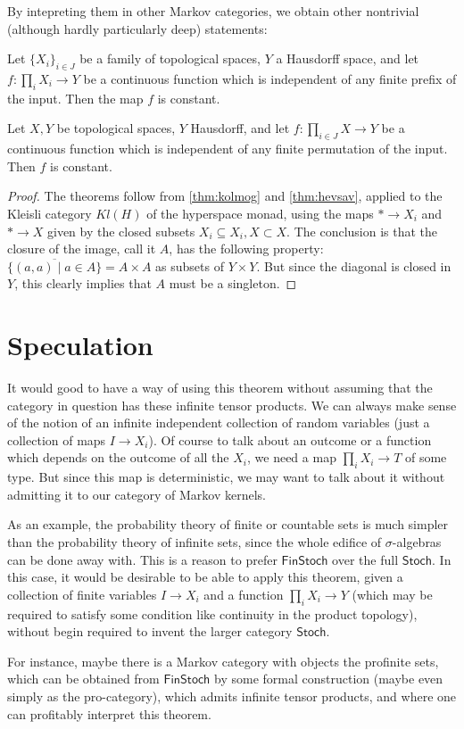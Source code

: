 \documentclass[11pt]{article}
\renewcommand{\sf}{\mathsf}
\begin{document}
By intepreting them in other Markov categories, we obtain other nontrivial (although hardly particularly deep) statements:

\begin{corollary}
    Let $\{X_i\}_{i \in J}$ be a family of topological spaces, $Y$ a Hausdorff space, and let $f: \prod_i X_i \to Y$ be a continuous function
    which is independent of any finite prefix of the input.
    Then the map $f$ is constant.
\end{corollary}
\begin{corollary}
    Let $X, Y$ be topological spaces, $Y$ Hausdorff, and let $f: \prod_{i\in J} X \to Y$ be a continuous function which is independent of any finite permutation of the input.
    Then $f$ is constant.
\end{corollary}
\begin{proof}
    The theorems follow from \cref{thm:kolmog} and \cref{thm:hevsav}, applied to the Kleisli category $Kl(H)$ of the hyperspace monad,
    using the maps $* \to X_i$ and $* \to X$ given by the closed subsets $X_i \subseteq X_i, X \subset X$.
    The conclusion is that the closure of the image, call it $A$, has the following property: $\overline{\{(a,a) \mid a \in A\}} = A \times A$ as subsets of $Y \times Y$.
    But since the diagonal is closed in $Y$, this clearly implies that $A$ must be a singleton.
\end{proof}


\section{Speculation}
It would good to have a way of using this theorem without assuming that the category in question has these infinite tensor products.
We can always make sense of the notion of an infinite independent collection of random variables (just a collection of maps $I \to X_i$).
Of course to talk about an outcome or a function which depends on the outcome of all the $X_i$, we need a map $\prod_i X_i \to T$ of some type.
But since this map is deterministic, we may want to talk about it without admitting it to our category of Markov kernels.

As an example, the probability theory of finite or countable sets is much simpler than the probability theory of infinite sets, since the whole edifice of $\sigma$-algebras can be done away with.
This is a reason to prefer $\sf{FinStoch}$ over the full $\sf{Stoch}$.
In this case, it would be desirable to be able to apply this theorem, given a collection of finite variables $I \to X_i$ and a function $\prod_i X_i \to Y$
(which may be required to satisfy some condition like continuity in the product topology), without begin required to invent the larger category $\sf{Stoch}$.

For instance, maybe there is a Markov category with objects the profinite sets, which can be obtained from $\sf{FinStoch}$ by some formal construction (maybe even simply as the pro-category), which admits infinite tensor products, and where one can profitably interpret this theorem.




\end{document}
